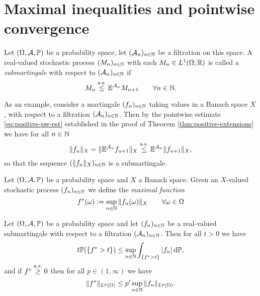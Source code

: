 \section{Maximal inequalities and pointwise convergence}


\begin{defn}
  Let $(\Omega, \mathcal{A}, \mathbb{P})$ be a probability space, let $(\mathcal{A}_n)_{n \in \mathbb{N}}$ be a filtration on this space.
  A real-valued stochastic process $(M_n)_{n \in \mathbb{N}}$ with each $M_n \in L^1(\Omega; \mathbb{R})$ is called a \emph{submartingale} with respect to $(\mathcal{A}_n)_{n \in \mathbb{N}}$ if 
  \begin{equation}\label{eq:mgale-defining-property}
    M_n \stackrel{\mathrm{a.s.}}{\leq} \mathbb{E}^{\mathcal{A}_n} M_{n+1} \qquad \forall n \in \mathbb{N}.
  \end{equation}
\end{defn}

As an example, consider a martingale $(f_n)_{n \in \mathbb{N}}$ taking values in a Banach space $X$, with respect to a filtration $(\mathcal{A}_{n})_{n \in \mathbb{N}}$.
Then by the pointwise estimate \eqref{eq:positive-pw-est} established in the proof of Theorem \ref{thm:positive-extensions} we have for all $n \in \mathbb{N}$ 
\begin{equation*}
  \|f_n\|_X = \|\mathbb{E}^{\mathcal{A}_n} f_{n+1}\|_X \stackrel{\mathrm{a.s.}}{\leq} \mathbb{E}^{\mathcal{A}_n} \|f_{n+1}\|_X,
\end{equation*}
so that the sequence $(\|f_n\|_X)_{n \in \mathbb{N}}$ is a submartingale.

\begin{defn}
  Let $(\Omega,\mathcal{A},\mathbb{P})$ be a probability space and $X$ a Banach space.
  Given an $X$-valued stochastic process $(f_{n})_{n \in \mathbb{N}}$ we define the \emph{maximal function}
  \begin{equation*}
    f^*(\omega) := \sup_{n \in \mathbb{N}} \|f_{n}(\omega)\|_{X} \qquad \forall \omega \in \Omega
  \end{equation*}
\end{defn}

\begin{thm}\label{thm:doob}
  Let $(\Omega, \mathcal{A}, \mathbb{P})$ be a probability space  and let $(f_{n})_{n \in \mathbb{N}}$ be a real-valued submartingale with respect to a filtration $(\mathcal{A}_{n})_{n \in \mathbb{N}}$.
  Then for all $t > 0$ we have
  \begin{equation*}
    t\mathbb{P}(\{f^* > t\}) \leq   \sup_{n \in \mathbb{N}} \int_{\{f^* > t\}} |f_{n}| \, \mathrm{d}\mathbb{P},
  \end{equation*}
  and if $f^* \stackrel{\mathrm{a.s.}}{\geq} 0$ then for all $p \in (1,\infty)$ we have
  \begin{equation*}
    \|f^*\|_{L^p(\Omega)} \leq p' \sup_{n \in \mathbb{N}} \|f_{n}\|_{L^p(\Omega)}.
  \end{equation*}
\end{thm}

